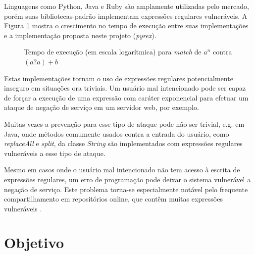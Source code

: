 \documentclass[a4paper,12pt,oneside,onecolumn]{uerj}
\begin{document}
Linguagens como Python, Java e Ruby são amplamente utilizadas pelo mercado, porém suas bibliotecas-padrão implementam expressões regulares vulneráveis. A Figura \ref{fig:benchmark1} mostra o crescimento no tempo de execução entre suas implementações e a implementação proposta neste projeto (\emph{pyrex}).

\begin{figure}[!htbp]
\centering
{}
\caption{Tempo de execução (em escala logarítmica) para \emph{match} de $a^n$ contra $(a?a)+b$}
\label{fig:benchmark1}
\end{figure}

Estas implementações tornam o uso de expressões regulares potencialmente inseguro em situações ora triviais. Um usuário mal intencionado pode ser capaz de forçar a execução de uma expressão com caráter exponencial para efetuar um ataque de negação de serviço em um servidor web, por exemplo. 

Muitas vezes a prevenção para esse tipo de ataque pode não ser trivial, e.g. em Java, onde métodos comumente usados contra a entrada do usuário, como \emph{replaceAll} e \emph{split}, da classe \emph{String} são implementados com expressões regulares vulneráveis a esse tipo de ataque.

Mesmo em casos onde o usuário mal intencionado não tem acesso à escrita de expressões regulares, um erro de programação pode deixar o sistema vulnerável a negação de serviço. Este problema torna-se especialmente notável pelo frequente compartilhamento em repositórios online, que contêm muitas expressões vulneráveis \cite{bib:Kirrage13,bib:Weidman10}. 

\section{Objetivo}
\end{document}
